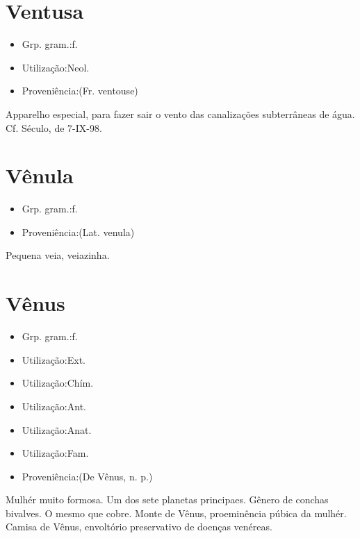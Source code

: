 \documentclass{article}
\begin{document}
\section{Ventusa}
\begin{itemize}
\item {Grp. gram.:f.}
\end{itemize}
\begin{itemize}
\item {Utilização:Neol.}
\end{itemize}
\begin{itemize}
\item {Proveniência:(Fr. \textunderscore ventouse\textunderscore )}
\end{itemize}
Apparelho especial, para fazer sair o vento das canalizações subterrâneas de água. Cf. \textunderscore Século\textunderscore , de 7-IX-98.
\section{Vênula}
\begin{itemize}
\item {Grp. gram.:f.}
\end{itemize}
\begin{itemize}
\item {Proveniência:(Lat. \textunderscore venula\textunderscore )}
\end{itemize}
Pequena veia, veiazinha.
\section{Vênus}
\begin{itemize}
\item {Grp. gram.:f.}
\end{itemize}
\begin{itemize}
\item {Utilização:Ext.}
\end{itemize}
\begin{itemize}
\item {Utilização:Chím.}
\end{itemize}
\begin{itemize}
\item {Utilização:Ant.}
\end{itemize}
\begin{itemize}
\item {Utilização:Anat.}
\end{itemize}
\begin{itemize}
\item {Utilização:Fam.}
\end{itemize}
\begin{itemize}
\item {Proveniência:(De \textunderscore Vênus\textunderscore , n. p.)}
\end{itemize}
Mulhér muito formosa.
Um dos sete planetas principaes.
Gênero de conchas bivalves.
O mesmo que \textunderscore cobre\textunderscore .
\textunderscore Monte de Vênus\textunderscore , proeminência púbica da mulhér.
\textunderscore Camisa de Vênus\textunderscore , envoltório preservativo de doenças venéreas.
\end{document}
